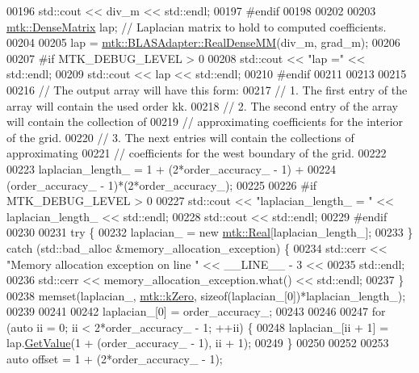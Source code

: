 \begin{DoxyCode}
00196   std::cout << div\_m << std::endl;
00197 \textcolor{preprocessor}{  #endif}
00198 
00202 
00203   \hyperlink{classmtk_1_1DenseMatrix}{mtk::DenseMatrix} lap; \textcolor{comment}{// Laplacian matrix to hold to computed coefficients.}
00204 
00205   lap = \hyperlink{classmtk_1_1BLASAdapter_acebd0e9bfe0bdd609c7fbea98ccfd3b5}{mtk::BLASAdapter::RealDenseMM}(div\_m, grad\_m);
00206 
00207 \textcolor{preprocessor}{  #if MTK\_DEBUG\_LEVEL > 0}
00208   std::cout << \textcolor{stringliteral}{"lap ="} << std::endl;
00209   std::cout << lap << std::endl;
00210 \textcolor{preprocessor}{  #endif}
00211 
00213 
00215 
00216   \textcolor{comment}{// The output array will have this form:}
00217   \textcolor{comment}{// 1. The first entry of the array will contain the used order kk.}
00218   \textcolor{comment}{// 2. The second entry of the array will contain the collection of}
00219   \textcolor{comment}{// approximating coefficients for the interior of the grid.}
00220   \textcolor{comment}{// 3. The next entries will contain the collections of approximating}
00221   \textcolor{comment}{// coefficients for the west boundary of the grid.}
00222 
00223   laplacian\_length\_ = 1 + (2*order\_accuracy\_ - 1) +
00224     (order\_accuracy\_ - 1)*(2*order\_accuracy\_);
00225 
00226 \textcolor{preprocessor}{  #if MTK\_DEBUG\_LEVEL > 0}
00227   std::cout << \textcolor{stringliteral}{"laplacian\_length\_ = "} << laplacian\_length\_ << std::endl;
00228   std::cout << std::endl;
00229 \textcolor{preprocessor}{  #endif}
00230 
00231   \textcolor{keywordflow}{try} \{
00232     laplacian\_ = \textcolor{keyword}{new} \hyperlink{group__c01-roots_gac080bbbf5cbb5502c9f00405f894857d}{mtk::Real}[laplacian\_length\_];
00233   \} \textcolor{keywordflow}{catch} (std::bad\_alloc &memory\_allocation\_exception) \{
00234     std::cerr << \textcolor{stringliteral}{"Memory allocation exception on line "} << \_\_LINE\_\_ - 3 <<
00235       std::endl;
00236     std::cerr << memory\_allocation\_exception.what() << std::endl;
00237   \}
00238   memset(laplacian\_, \hyperlink{group__c01-roots_ga59a451a5fae30d59649bcda274fea271}{mtk::kZero}, \textcolor{keyword}{sizeof}(laplacian\_[0])*laplacian\_length\_);
00239 
00241 
00242   laplacian\_[0] = order\_accuracy\_;
00243 
00246 
00247   \textcolor{keywordflow}{for} (\textcolor{keyword}{auto} ii = 0; ii < 2*order\_accuracy\_ - 1; ++ii) \{
00248     laplacian\_[ii + 1] = lap.\hyperlink{classmtk_1_1DenseMatrix_a87fb785713c04b13767947cc3325ce7c}{GetValue}(1 + (order\_accuracy\_ - 1), ii + 1);
00249   \}
00250 
00252 
00253   \textcolor{keyword}{auto} offset = 1 + (2*order\_accuracy\_ - 1);

\end{DoxyCode}
